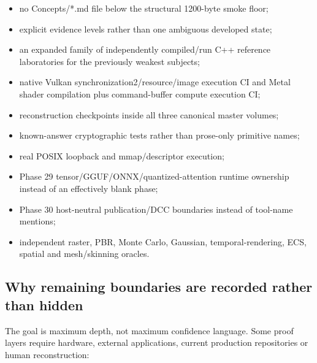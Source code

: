\begin{itemize}
\tightlist
\item
  no Concepts/*.md file below the structural 1200-byte smoke floor;
\item
  explicit evidence levels rather than one ambiguous developed state;
\item
  an expanded family of independently compiled/run C++ reference laboratories for the previously weakest subjects;
\item
  native Vulkan synchronization2/resource/image execution CI and Metal shader compilation plus command-buffer compute execution CI;
\item
  reconstruction checkpoints inside all three canonical master volumes;
\item
  known-answer cryptographic tests rather than prose-only primitive names;
\item
  real POSIX loopback and mmap/descriptor execution;
\item
  Phase 29 tensor/GGUF/ONNX/quantized-attention runtime ownership instead of an effectively blank phase;
\item
  Phase 30 host-neutral publication/DCC boundaries instead of tool-name mentions;
\item
  independent raster, PBR, Monte Carlo, Gaussian, temporal-rendering, ECS, spatial and mesh/skinning oracles.
\end{itemize}

\subsection{Why remaining boundaries are recorded rather than hidden}\label{appendix-2358b21a702d-why-remaining-boundaries-are-recorded-rather-than-hidden}

The goal is maximum depth, not maximum confidence language. Some proof layers require hardware, external applications, current production repositories or human reconstruction:

